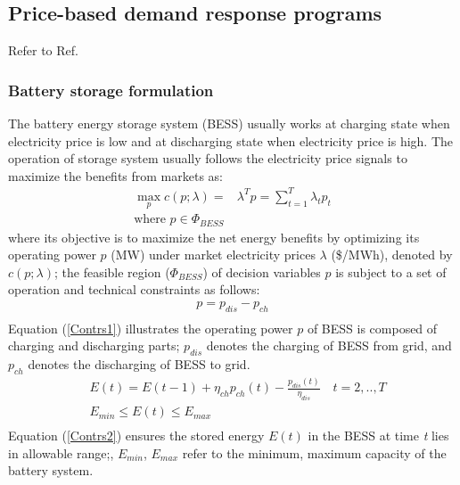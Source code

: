 \documentclass[journal]{IEEEtran}
\newcommand{\slw}{\color{blue}}
\begin{document}
\subsection{Price-based demand response programs}
{\slw Refer to Ref. \cite{Chitsaz2018}}
\subsubsection{Battery storage formulation}
The battery energy storage system (BESS) usually works at charging state when electricity price is low and at discharging state when electricity price is high. The operation of storage system usually follows the electricity price signals to maximize the benefits from markets as:
\begin{equation}
  \label{ESbigM}
  \begin{aligned}
    \max_{p} c(p; \lambda) = &\lambda^T p = \sum_{t=1}^T \lambda_t p_t \\
    \text{where }  p \in \Phi_{BESS}
  \end{aligned}
\end{equation}
where its objective is to maximize the net energy benefits by optimizing its operating power $p$ (MW) under market electricity prices $\lambda$ (\$/MWh), denoted by $c(p; \lambda)$; the feasible region ($\Phi_{BESS}$) of decision variables $p$ is subject to a set of operation and technical constraints as follows:
\begin{equation}
  \label{Contrs1}
  \begin{aligned}
    p = p_{dis} - p_{ch} \\
  \end{aligned}
\end{equation}
Equation (\ref{Contrs1}) illustrates the operating power $p$ of BESS is composed of charging and discharging parts; $p_{dis}$ denotes the charging of BESS from grid, and $p_{ch}$ denotes the discharging of BESS to grid.
\begin{equation}
  \label{Contrs2}
  \begin{aligned}
    &E(t) = E(t-1) + \eta_{ch} p_{ch}(t) - \frac{p_{dis}(t)}{\eta_{dis}} \quad t=2,..,T\\
    &E_{min} \leq E(t) \leq E_{max} \\
  \end{aligned}
\end{equation}
Equation (\ref{Contrs2}) ensures the stored energy $E(t)$ in the BESS at time \textit{t} lies in allowable range;, $E_{min}$, $E_{max}$ refer to the minimum, maximum capacity of the battery system.
\end{document}
